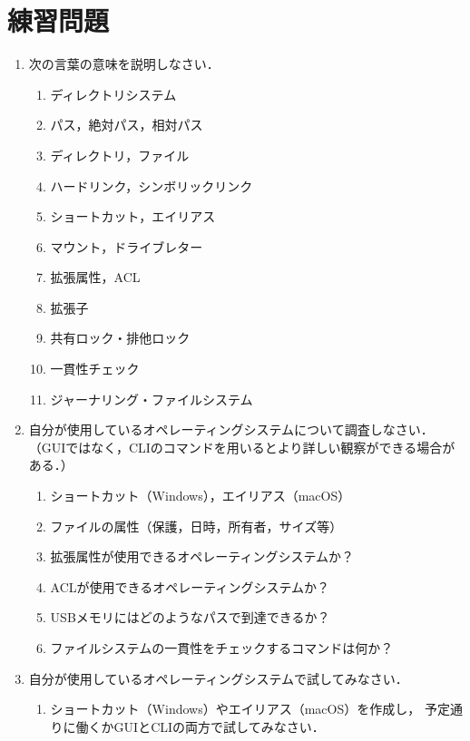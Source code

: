 \section*{練習問題}
\begin{enumerate}
  \renewcommand{\labelenumi}{\ttfamily\arabic{chapter}.\arabic{enumi}}
  \setlength{\leftskip}{1em}
\item 次の言葉の意味を説明しなさい．
  \begin{enumerate}
  \item ディレクトリシステム
  \item パス，絶対パス，相対パス
  \item ディレクトリ，ファイル
  \item ハードリンク，シンボリックリンク
  \item ショートカット，エイリアス
  \item マウント，ドライブレター
  \item 拡張属性，ACL
  \item 拡張子
  \item 共有ロック・排他ロック
  \item 一貫性チェック
  \item ジャーナリング・ファイルシステム
  \end{enumerate}
\item 自分が使用しているオペレーティングシステムについて調査しなさい．\\
  （GUIではなく，CLIのコマンドを用いるとより詳しい観察ができる場合がある．）
  \begin{enumerate}
  \item ショートカット（Windows），エイリアス（macOS）
  \item ファイルの属性（保護，日時，所有者，サイズ等）
  \item 拡張属性が使用できるオペレーティングシステムか？
  \item ACLが使用できるオペレーティングシステムか？
  \item USBメモリにはどのようなパスで到達できるか？
  \item ファイルシステムの一貫性をチェックするコマンドは何か？
  \end{enumerate}
\item 自分が使用しているオペレーティングシステムで試してみなさい．
  \begin{enumerate}
  \item ショートカット（Windows）やエイリアス（macOS）を作成し，
    予定通りに働くかGUIとCLIの両方で試してみなさい．
\begin{lstlisting}

\end{lstlisting}
\end{enumerate}
\end{enumerate}
